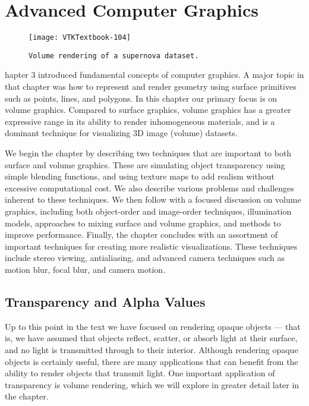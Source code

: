 \chapter{Advanced Computer Graphics}
\label{chap:advanced_computer_graphics}

\begin{figure}[ht]
	\hfill
	\begin{minipage}{0.5\textwidth}
		\centering
		\texttt{[image: VTKTextbook-104]}\\
		\caption*{\texttt{Volume rendering of a supernova dataset.}}
	\end{minipage}
\end{figure}

hapter 3 introduced fundamental concepts of computer graphics.
A major topic in that chapter was how to represent and render geometry using surface primitives such as points, lines, and polygons.
In this chapter our primary focus is on volume graphics.
Compared to surface graphics, volume graphics has a greater expressive range in its ability to render inhomogeneous materials, and is a dominant technique for visualizing 3D image (volume) datasets.

We begin the chapter by describing two techniques that are important to both surface and volume graphics.
These are simulating object transparency using simple blending functions, and using texture maps to add realism without excessive computational cost.
We also describe various problems and challenges inherent to these techniques.
We then follow with a focused discussion on volume graphics, including both object-order and image-order techniques, illumination models, approaches to mixing surface and volume graphics, and methods to improve performance.
Finally, the chapter concludes with an assortment of important techniques for creating more realistic visualizations.
These techniques include stereo viewing, antialiasing, and advanced camera techniques such as motion blur, focal blur, and camera motion.

\section{Transparency and Alpha Values}

Up to this point in the text we have focused on rendering opaque objects — that is, we have assumed that objects reflect, scatter, or absorb light at their surface, and no light is transmitted through to their interior. Although rendering opaque objects is certainly useful, there are many applications that can benefit from the ability to render objects that transmit light. One important
application of transparency is volume rendering, which we will explore in greater detail later in the chapter.

